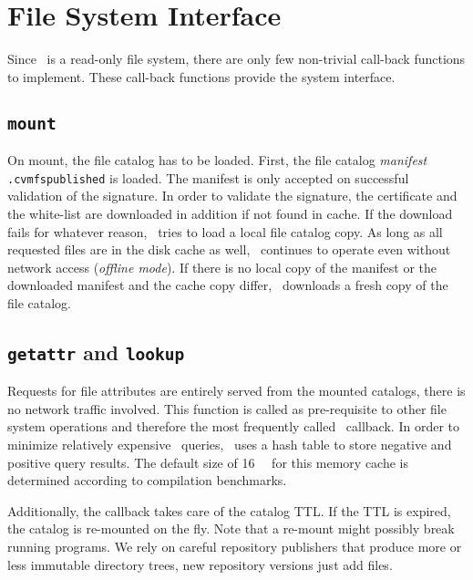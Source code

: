 
\section{File System Interface}
\label{sct:interface}

Since \cvmfs\ is a read-only file system, there are only few non-trivial call-back functions to implement.
These call-back functions provide the system interface.

\subsection{\tt mount}
On mount, the file catalog has to be loaded.
First, the file catalog \emph{manifest} \texttt{.cvmfspublished} is loaded.
The manifest is only accepted on successful validation of the signature.
In order to validate the signature, the certificate and the white-list are downloaded in addition if not found in cache.
If the download fails for whatever reason, \cvmfs\ tries to load a local file catalog copy.
As long as all requested files are in the disk cache as well, \cvmfs\ continues to operate even without network access (\emph{offline mode}).
If there is no local copy of the manifest or the downloaded manifest and the cache copy differ, \cvmfs\ downloads a fresh copy of the file catalog.

\subsection{{\tt getattr} and {\tt lookup}}
Requests for file attributes are entirely served from the mounted catalogs, \ie there is no network traffic involved.
This function is called as pre-requisite to other file system operations and therefore the most frequently called \fuse\ callback.
In order to minimize relatively expensive \sqlite\ queries, \cvmfs\ uses a hash table to store negative and positive query results.
The default size of \SI{16}{\mega\byte} for this memory cache is determined according to compilation benchmarks.

Additionally, the callback takes care of the catalog TTL.
If the TTL is expired, the catalog is re-mounted on the fly.
Note that a re-mount might possibly break running programs.
We rely on careful repository publishers that produce more or less immutable directory trees, \ie new repository versions just add files.

